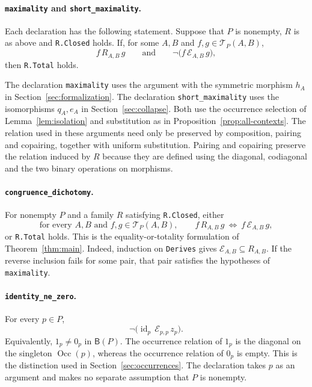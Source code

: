 \documentclass[11pt]{article}
\newcommand{\B}{\mathsf B}
\newcommand{\Occ}{\operatorname{Occ}}
\begin{document}
\paragraph{\texttt{maximality} and \texttt{short\_maximality}.}
Each declaration has the following statement. Suppose that $P$ is
nonempty, $R$ is as above and \texttt{R.Closed} holds. If, for some
$A,B$ and $f,g\in\mathcal T_P(A,B)$,
\[
 f\,R_{A,B}\,g
 \qquad\text{and}\qquad
 \neg\bigl(f\,\mathcal E_{A,B}\,g\bigr),
\]
then \texttt{R.Total} holds.

The declaration \texttt{maximality} uses the argument with the
symmetric morphism $h_A$ in Section~\ref{sec:formalization}.
The declaration \texttt{short\_maximality} uses the isomorphisms
$q_A,e_A$ in Section~\ref{sec:collapse}.
Both use the occurrence selection of Lemma~\ref{lem:isolation}
and substitution as in Proposition~\ref{prop:all-contexts}.
The relation used in these arguments need only be preserved by
composition, pairing and copairing, together with uniform substitution.
Pairing and copairing preserve the relation induced by $R$ because
they are defined using the diagonal, codiagonal and the two binary
operations on morphisms.

\paragraph{\texttt{congruence\_dichotomy}.}
For nonempty $P$ and a family $R$ satisfying \texttt{R.Closed},
either
\[
 \text{for every }A,B\text{ and }f,g\in\mathcal T_P(A,B),\qquad
 f\,R_{A,B}\,g\ \Longleftrightarrow\ f\,\mathcal E_{A,B}\,g,
\]
or \texttt{R.Total} holds. This is the equality-or-totality formulation
of Theorem~\ref{thm:main}.
Indeed, induction on \texttt{Derives} gives $\mathcal E_{A,B}\subseteq
R_{A,B}$. If the reverse inclusion fails for some pair, that pair
satisfies the hypotheses of \texttt{maximality}.

\paragraph{\texttt{identity\_ne\_zero}.}
For every $p\in P$,
\[
 \neg\bigl(\operatorname{id}_p\,\mathcal E_{p,p}\,z_p\bigr).
\]
Equivalently, $1_p\ne0_p$ in $\B(P)$.
The occurrence relation of $1_p$ is the diagonal on the singleton
$\Occ(p)$, whereas the occurrence relation of $0_p$ is empty.
This is the distinction used in Section~\ref{sec:occurrences}.
The declaration takes $p$ as an argument and makes no separate
assumption that $P$ is nonempty.
\end{document}
